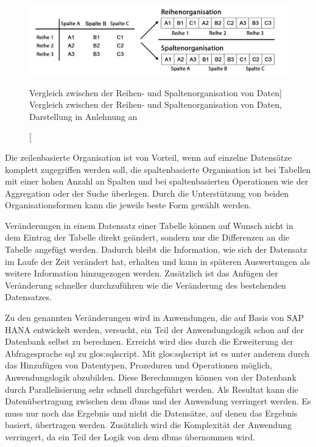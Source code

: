 \begin{onehalfspacing}
\begin{figure}[!ht]
\centering
\setlength{\unitlength}{1mm}
\includegraphics[width=15cm]{images/in-memory-row-column.pdf}
\caption
[Vergleich zwischen der Reihen- und Spaltenorganisation von Daten]
{Vergleich zwischen der Reihen- und Spaltenorganisation von Daten, Darstellung in Anlehnung an  \label{fig:vergleich_spalte_zeile}}
\end{figure}

Die zeilenbasierte Organisation ist von Vorteil, wenn auf einzelne Datensätze komplett zugegriffen werden soll, die spaltenbasierte Organisation ist bei Tabellen mit einer hohen Anzahl an Spalten und bei spaltenbasierten Operationen wie der Aggregation oder der Suche überlegen. Durch die Unterstützung von beiden Organisationsformen kann die jeweils beste Form gewählt werden.

Veränderungen in einem Datensatz einer Tabelle können auf Wunsch nicht in dem Eintrag der Tabelle direkt geändert, sondern nur die Differenzen an die Tabelle angefügt werden. Dadurch bleibt die Information, wie sich der Datensatz im Laufe der Zeit verändert hat, erhalten und kann in späteren Auswertungen als weitere Information hinzugezogen werden. Zusätzlich ist das Anfügen der Veränderung schneller durchzuführen wie die Veränderung des bestehenden Datensatzes.

Zu den genannten Veränderungen wird in Anwendungen, die auf Basis von SAP HANA entwickelt werden, versucht, ein Teil der Anwendungslogik schon auf der Datenbank selbst zu berechnen. Erreicht wird dies durch die Erweiterung der Abfragesprache \gls{sql} zu \gls{glos:sqlscript}. Mit \gls{glos:sqlscript} ist es unter anderem durch das Hinzufügen von Datentypen, Prozeduren und Operationen möglich, Anwendungslogik abzubilden. Diese Berechnungen können von der Datenbank durch Parallelisierung sehr schnell durchgeführt werden. Als Resultat kann die Datenübertragung zwischen dem \gls{dbms} und der Anwendung verringert werden. Es muss nur noch das Ergebnis und nicht die Datensätze, auf denen das Ergebnis basiert, übertragen werden. Zusätzlich wird die Komplexität der Anwendung verringert, da ein Teil der Logik von dem \gls{dbms} übernommen wird.


\end{onehalfspacing}
